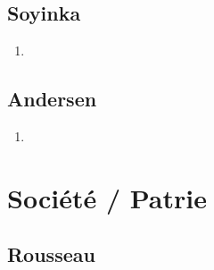 \documentclass[a4paper, 11pt, hidelinks]{article}
\begin{document}
\subsection{Soyinka}


\begin{enumerate}
    \item 
\end{enumerate}




\subsection{Andersen}


\begin{enumerate}
    \item 
\end{enumerate}
































\section{Société / Patrie}



\subsection{Rousseau}
\end{document}
